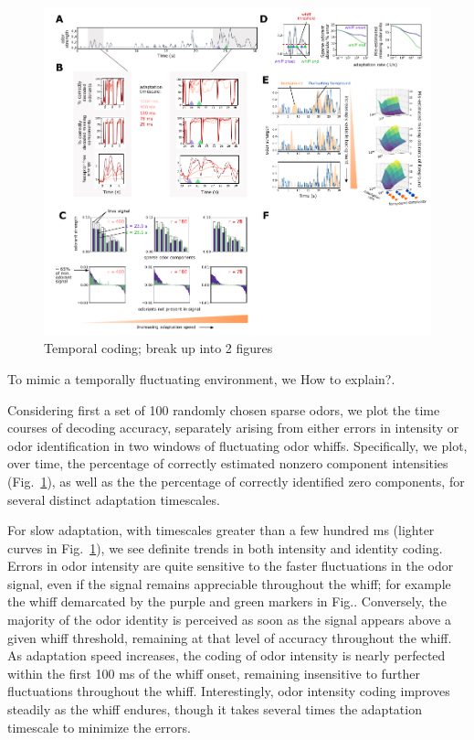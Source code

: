 \begin{figure}
	\includegraphics[width=\textwidth]{figures/Figures_temporal_coding}
	\caption{Temporal coding; {\color{blue} break up into 2 figures}}
	\label{fig:temporal_coding}
\end{figure}

To mimic a temporally fluctuating environment, we {\color{blue} How to explain?}. 


Considering first a set of 100 randomly chosen sparse odors, we plot the time courses of decoding accuracy, separately arising from either errors in intensity or odor identification in two windows of fluctuating odor whiffs. Specifically, we plot, over time, the percentage of correctly estimated nonzero component intensities (Fig.~\ref{fig:temporal_coding}), as well as the the percentage of correctly identified zero components, for several distinct adaptation timescales. 

For slow adaptation, with timescales greater than a few hundred ms (lighter curves in Fig.~\ref{fig:temporal_coding}), we see definite trends in both intensity and identity coding. Errors in odor intensity are quite sensitive to the faster fluctuations in the odor signal, even if the signal remains appreciable throughout the whiff; for example the whiff demarcated by the purple and green markers in Fig.. Conversely, the majority of the odor identity is perceived as soon as the signal appears above a given whiff threshold, remaining at that level of accuracy throughout the whiff. As adaptation speed increases, the coding of odor intensity is nearly perfected within the first 100 ms of the whiff onset, remaining insensitive to further fluctuations throughout the whiff. Interestingly, odor intensity coding improves steadily as the whiff endures, though it takes several times the adaptation timescale to minimize the errors. 

